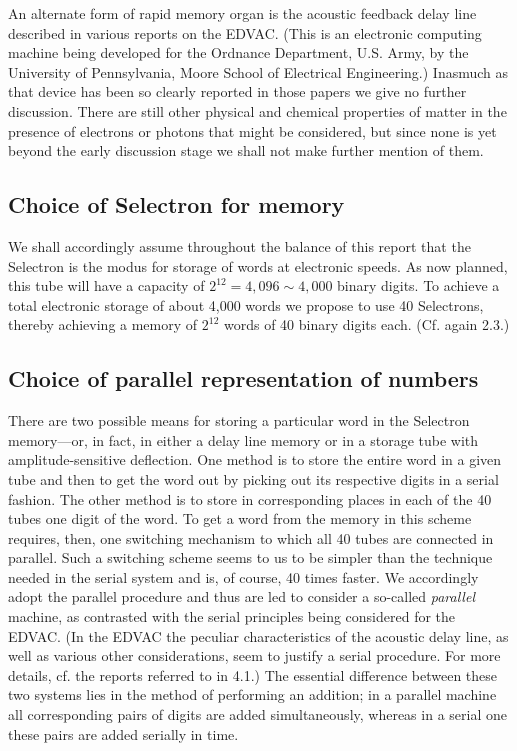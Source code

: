 \documentclass[12pt]{amsart}
\begin{document}
An alternate form of rapid memory organ is the acoustic feedback delay line described in various reports on the EDVAC. (This is an electronic computing machine being developed for the Ordnance Department, U.S. Army, by the University of Pennsylvania, Moore School of Electrical Engineering.) Inasmuch as that device has been so clearly reported in those papers we give no further discussion. There are still other physical and chemical properties of matter in the presence of electrons or photons that might be considered, but since none is yet beyond the early discussion stage we shall not make further mention of them.

\subsection{Choice of Selectron for memory}
We shall accordingly assume throughout the balance of this report that the Selectron is the modus for storage of words at electronic speeds. As now planned, this tube will have a capacity of $2^{12} = 4,096 \sim 4,000$ binary digits. To achieve a total electronic storage of about 4,000 words we propose to use 40 Selectrons, thereby achieving a memory of $2^{12}$ words of 40 binary digits each. (Cf. again 2.3.)

\subsection{Choice of parallel representation of numbers}
There are two possible means for storing a particular word in the Selectron memory---or, in fact, in either a delay line memory or in a storage tube with amplitude-sensitive deflection. One method is to store the entire word in a given tube and then to get the word out by picking out its respective digits in a serial fashion. The other method is to store in corresponding places in each of the 40 tubes one digit of the word. To get a word from the memory in this scheme requires, then, one switching mechanism to which all 40 tubes are connected in parallel. Such a switching scheme seems to us to be simpler than the technique needed in the serial system and is, of course, 40 times faster. We accordingly adopt the parallel procedure and thus are led to consider a so-called \emph{parallel} machine, as contrasted with the serial principles being considered for the EDVAC. (In the EDVAC the peculiar characteristics of the acoustic delay line, as well as various other considerations, seem to justify a serial procedure. For more details, cf. the reports referred to in 4.1.) The essential difference between these two systems lies in the method of performing an addition; in a parallel machine all corresponding pairs of digits are added simultaneously, whereas in a serial one these pairs are added serially in time.
\end{document}
